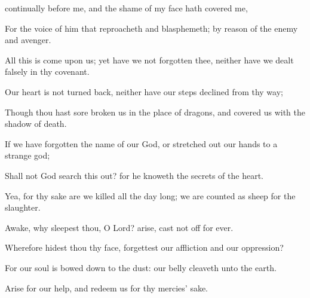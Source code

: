 {continually before me, and the
shame of my
face hath
covered me,
\par }{\Q {}For the
voice of him that
reproacheth and
blasphemeth; by
reason of the
enemy and
avenger.
\par }{\BB \par }{\Q {}All this is
come upon us; yet have we not
forgotten thee, neither have we dealt
falsely in thy
covenant.
\par }{\Q {}Our
heart is not
turned
back, neither have our
steps
declined from thy
way;
\par }{\Q {}Though thou hast sore
broken us in the
place of
dragons, and
covered us with the shadow of
death.
\par }{\Q {}If we have
forgotten the
name of our
God, or stretched
out our
hands to a
strange
god;
\par }{\Q {}Shall not
God search this
out? for he
knoweth the
secrets of the
heart.
\par }{\Q {}Yea, for thy sake are we
killed all the
day long; we are
counted as
sheep for the
slaughter.
\par }{\Q {}Awake, why
sleepest thou, O
Lord?
arise, cast
{} not
off for
ever.
\par }{\Q {}Wherefore
hidest thou thy
face,
{}
forgettest our
affliction and our
oppression?
\par }{\Q {}For our
soul is bowed
down to the
dust: our
belly
cleaveth unto the
earth.
\par }{\Q {}Arise for our
help, and
redeem us for thy
mercies’ sake.

}
